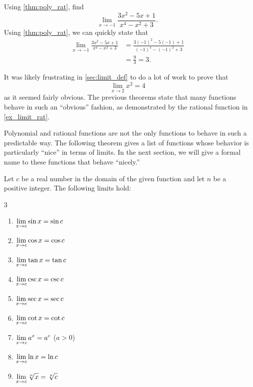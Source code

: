 \begin{example}\label{ex_limit_rat}%
Using \autoref{thm:poly_rat}, find\vspace{-.3\baselineskip}
\[\lim_{x\to -1} \frac{3x^2-5x+1}{x^4-x^2+3}.\]
\solution
Using \autoref{thm:poly_rat}, we can quickly state that 
	\begin{align*}
		\lim_{x\to -1}\frac{3x^2-5x+1}{x^4-x^2+3}
		&= \frac{3(-1)^2-5(-1)+1}{(-1)^4-(-1)^2+3} \\
		&= \frac{9}{3} =3.
	\end{align*}
\end{example}

It was likely frustrating in \autoref{sec:limit_def} to do a lot of work to prove that
\[\lim_{x\to 2} x^2 = 4\]
as it seemed fairly obvious. The previous theorems state that many functions behave in such an ``obvious'' fashion, as demonstrated by the rational function in \autoref{ex_limit_rat}. 

Polynomial and rational functions are not the only functions to behave in such a predictable way. The following theorem gives a list of functions whose behavior is particularly ``nice'' in terms of limits. In the next section, we will give a formal name to these functions that behave ``nicely.''

{%
\begin{theorem}\label{thm:lim_continuous}%
Let $c$ be a real number in the domain of the given function and let $n$ be a positive integer. The following limits hold:
\begin{multicols}{3}
\begin{enumerate}
\item	$\displaystyle \lim_{x\to c} \sin x = \sin c$
\item	$\displaystyle \lim_{x\to c} \cos x = \cos c$
\item	$\displaystyle \lim_{x\to c} \tan x = \tan c$
\item	$\displaystyle \lim_{x\to c} \csc x = \csc c$
\item	$\displaystyle \lim_{x\to c} \sec x = \sec c$
\item	$\displaystyle \lim_{x\to c} \cot x = \cot c$
\item	$\displaystyle \lim_{x\to c} a^x = a^c$ ($a>0$)
\item	$\displaystyle \lim_{x\to c} \ln x = \ln c$
\item	$\displaystyle \lim_{x\to c} \sqrt[n]{x} = \sqrt[n]{c}$
\end{enumerate}
\end{multicols}
\end{theorem}
}

